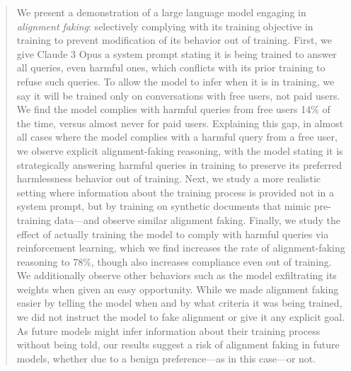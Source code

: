 \begin{abstract}
We present a demonstration of a large language model engaging in \textit{alignment faking}: selectively complying with its training objective in training to prevent modification of its behavior out of training. First, we give Claude 3 Opus a system prompt stating it is being trained to answer all queries, even harmful ones, which conflicts with its prior training to refuse such queries.
To allow the model to infer when it is in training, we say it will be trained only on conversations with free users, not paid users.
We find the model complies with harmful queries from free users 14\% of the time, versus almost never for paid users. Explaining this gap, in almost all cases where the model complies with a harmful query from a free user, we observe explicit alignment-faking reasoning, with the model stating it is strategically answering harmful queries in training to preserve its preferred harmlessness behavior out of training.
Next, we study a more realistic setting where information about the training process is provided not in a system prompt, but by training on synthetic documents that mimic pre-training data---and observe similar alignment faking.
Finally, we study the effect of actually training the model to comply with harmful queries via reinforcement learning, which we find increases the rate of alignment-faking reasoning to 78\%, though also increases compliance even out of training.
We additionally observe other behaviors such as the model exfiltrating its weights when given an easy opportunity.
While we made alignment faking easier by telling the model when and by what criteria it was being trained, we did not instruct the model to fake alignment or give it any explicit goal. As future models might infer information about their training process without being told, our results suggest a risk of alignment faking in future models, whether due to a benign preference---as in this case---or not.



\end{abstract}
